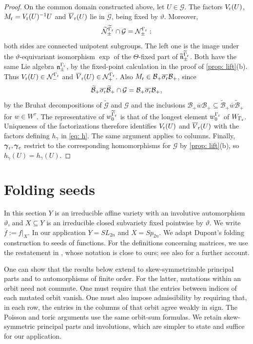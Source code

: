 \documentclass[a4paper]{amsart}
\numberwithin{equation}{section}
\theoremstyle{definition}
\theoremstyle{remark}
\newcommand{\mfn}{\mathfrak{n}}
\newcommand{\mcG}{\mathcal{G}}
\newcommand{\mcN}{\mathcal{N}}
\newcommand{\mcB}{\mathcal{B}}
\newcommand{\tG}{\widetilde{\mcG}}
\newcommand{\tg}{\widetilde{\gamma}}
\newcommand{\vt}{\vartheta}
\newcommand{\Vt}{\Theta}
\newcommand{\rr}{{\rm r}}
\newcommand{\cc}{{\rm c}}
\newcommand{\Sp}{Sp_{2n}}
\newcommand{\SL}{SL_{2n}}
\begin{document}
\begin{proof}
  On the common domain constructed above, let $U\in\mcG$.
  The factors $V_{\rr}(U)$, $M_{\rr}=V_{\rr}(U)^{-1}U$ and $\overline{V}_{\rr}(U)$ lie in $\mcG$, being fixed by $\vt$.
  Moreover,
  \[
    \widetilde{\mcN}_\pm^{\widetilde{\Gamma}_{\rr}}\cap\mcG=\mcN_\pm^{\Gamma_{\rr}}:
  \]
  both sides are connected unipotent subgroups.
  The left one is the image under the $\vt$-equivariant isomorphism $\exp$ of the $\Vt$-fixed part of $\widetilde{\mfn}_\pm^{\widetilde{\Gamma}_{\rr}}$.
  Both have the same Lie algebra $\mfn_\pm^{\Gamma_{\rr}}$, by the fixed-point calculation in the proof of \cref{prop: lift}(b).
  Thus $V_{\rr}(U)\in\mcN_-^{\Gamma_{\rr}}$ and $\overline{V}_{\rr}(U)\in\mcN_+^{\Gamma_{\rr}}$.
  Also $M_{\rr}\in\mcB_+\overline{\sigma_{\rr}}\mcB_+$, since
  \[
    \widetilde{\mcB}_+\overline{\sigma_{\rr}}\widetilde{\mcB}_+\cap\mcG
    =\mcB_+\overline{\sigma_{\rr}}\mcB_+,
  \]
  by the Bruhat decompositions of $\tG$ and $\mcG$ and the inclusions $\mcB_+\overline{w}\mcB_+\subseteq\widetilde{\mcB}_+\overline{w}\widetilde{\mcB}_+$ for $w\in W^\tau$.
  The representative of $w_0^{\widetilde{\Gamma}_{\rr}}$ is that of the longest element $w_0^{\Gamma_{\rr}}$ of $W_{\Gamma_{\rr}}$.
  Uniqueness of the factorizations therefore identifies $V_{\rr}(U)$ and $\overline{V}_{\rr}(U)$ with the factors defining $h_\gamma$ in \eqref{eq: h}. The same argument applies to columns.
  Finally, $\boldsymbol\gamma_{\rr},\boldsymbol\gamma_{\cc}$ restrict to the corresponding homomorphisms for $\mcG$ by \cref{prop: lift}(b), so $h_{\tg}(U)=h_\gamma(U)$.
\end{proof}

\section{Folding seeds}
\label{sec: folding}
In this section $Y$ is an irreducible affine variety with an involutive automorphism $\vt$, and $X\subseteq Y$ is an irreducible closed subvariety fixed pointwise by $\vt$.
  We write $\overline{f}:=f|_X$.
In our application $Y=\SL$ and $X=\Sp$.
We adapt Dupont's folding construction \cite{Dup08} to seeds of functions.
For the definitions concerning matrices, we use the restatement in \cite[Section~5.1]{NS14}, whose notation is close to ours; see also \cite[Section~2.3]{Vie18} for a further account.

\begin{remark}
  \label{rmk: folding generality}
  One can show that the results below extend to skew-symmetrizable principal parts and to automorphisms of finite order.
  For the latter, mutations within an orbit need not commute.
  One must require that the entries between indices of each mutated orbit vanish.
  One must also impose admissibility by requiring that, in each row, the entries in the columns of that orbit agree weakly in sign.
  The Poisson and toric arguments use the same orbit-sum formulas.
  We retain skew-symmetric principal parts and involutions, which are simpler to state and suffice for our application.
\end{remark}
\end{document}
